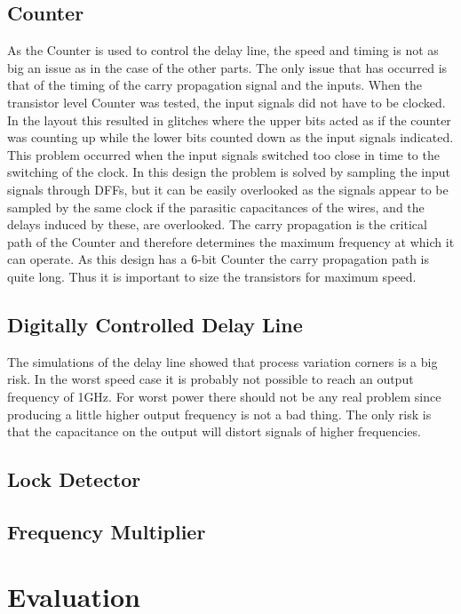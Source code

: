 \documentclass[a4paper,12pt]{article} \usepackage{graphicx}
\begin{document}
\subsection{Counter}
As the Counter is used to control the delay line, the speed and timing is not as
big an issue as in the case of the other parts. The only issue that has occurred
is that of the timing of the carry propagation signal and the inputs. When the
transistor level Counter was tested, the input signals did not have to be
clocked. In the layout this resulted in glitches where the upper bits acted as
if the counter was counting up while the lower bits counted down as the input
signals indicated. This problem occurred when the input signals switched too
close in time to the switching of the clock. In this design the problem is
solved by sampling the input signals through DFFs, but it can be easily
overlooked as the signals appear to be sampled by the same clock if the
parasitic capacitances of the wires, and the delays induced by these, are
overlooked. The carry propagation is the critical path of the Counter and
therefore determines the maximum frequency at which it can operate. As this
design has a 6-bit Counter the carry propagation path is quite long. Thus it is
important to size the transistors for maximum speed. 

\subsection{Digitally Controlled Delay Line}
The simulations of the delay line showed that process variation corners is a big
risk. In the worst speed case it is probably not possible to reach an output
frequency of 1GHz. For worst power there should not be any real problem since
producing a little higher output frequency is not a bad thing. The only risk is
that the capacitance on the output will distort signals of higher frequencies.

\subsection{Lock Detector}
\subsection{Frequency Multiplier}

\section{Evaluation}
\end{document}
